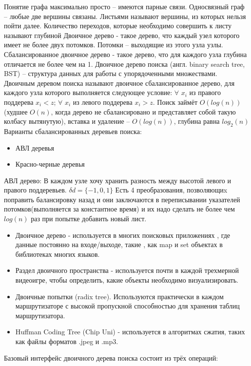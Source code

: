 \documentclass[a4paper, 12pt]{article}
\begin{document}
	Понятие графа максимально просто -- имеются парные связи.  Односвязный граф -- любые две вершины связаны. Листьями называют вершины, из которых нельзя пойти далее. Количество переходов, которые необходимо совершить к листу называют глубиной
	Двоичное дерево - такое дерево, что каждый узел которого имеет не более двух потомков. Потомки -- выходящие из этого узла узлы. Сбалансированное двоичное дерево - такое дерево, что для каждого узла глубина отличается не более чем на 1. Двоичное дерево поиска (англ. binary search tree, BST) -- структура данных для работы с упорядоченными множествами.  Двоичным деревом поиска называют двоичное сбалансированное дерево, для каждого узла которого выполняется следующее условие:
	$\forall$ $x_{i}$ из правого поддерева $x_i<z$; $\forall$ $x_{i}$ из левого поддерева $x_i>z$.
	Поиск займёт $O(log(n))$ (худшее $O(n)$, когда дерево не сбалансировано и представляет собой такую колбасу вытянутую), вставка и удаление -- $O(log(n))$, глубина равна $log_{2}(n)$ 
	Варианты сбалансированных деревьев поиска:
	\begin{itemize}
		\item АВЛ деревья
		\item Красно-черные деревья
	\end{itemize}
	АВЛ дерево: В каждом узле хочу хранить разность между высотой левого и правого поддеревьев. $\delta d = \{  -1, 0, 1 \}$ Есть 4 преобразования, позволяющиx поправить балансировку назад и они заключаются в переписывании указателей потомков(выполняется за константное время) и их надо сделать не более чем $log(n)$ раз при попытке добавить новый лист.
	\begin{itemize}
	\item Двоичное дерево - используется в многих поисковых приложениях , где данные постоянно на входе/выходе, такие , как map и set объектах в библиотеках многих языков.
	\item Раздел двоичного пространства - используется почти в каждой трехмерной видеоигре, чтобы определить, какие объекты необходимо визуализировать.
	\item Двоичные попытки (radix tree). Используются практически в каждом маршрутизаторе с высокой пропускной способностью для хранения таблиц маршрутизатора.
	\item Huffman Coding Tree (Chip Uni) - используется в алгоритмах сжатия, таких как файлы форматов .jpeg и .mp3.
	\end{itemize}
	Базовый интерфейс двоичного дерева поиска состоит из трёх операций:
\end{document}
